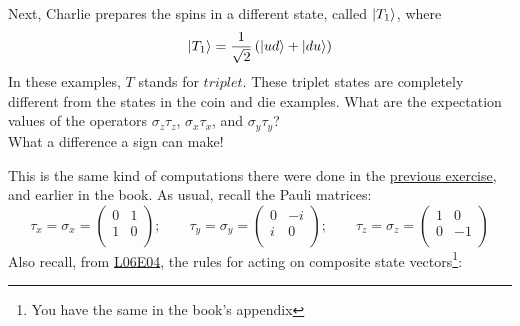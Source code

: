 \documentclass[solutions.tex]{subfiles}
\begin{document}
\maketitle
\begin{exercise} Next, Charlie prepares the spins in a different
state, called $|T_1\rangle$, where
\[
	|T_1\rangle = \frac1{\sqrt2}\left(|ud\rangle+|du\rangle\right)
\]
In these examples, $T$ stands for $\textit{triplet}$. These triplet
states are completely different from the states in the coin and die
examples. What are the expectation values of the operators $\sigma_z\tau_z$,
$\sigma_x\tau_x$, and $\sigma_y\tau_y$? \\

What a difference a sign can make!
\end{exercise}
This is the same kind of computations there were done in the
\href{https://github.com/mbivert/ttm/blob/master/qm/L06E06.pdf}{previous exercise},
and earlier in the book. As usual, recall the Pauli matrices:
\[
	\tau_x = \sigma_x = \begin{pmatrix}
		0 & 1 \\
		1 & 0 \\
	\end{pmatrix};\qquad \tau_y = \sigma_y = \begin{pmatrix}
		0 & -i \\
		i & 0 \\
	\end{pmatrix};\qquad \tau_z = \sigma_z = \begin{pmatrix}
		1 & 0 \\
		0 & -1 \\
	\end{pmatrix}
\]
Also recall, from
\href{https://github.com/mbivert/ttm/blob/master/qm/L06E04.pdf}{L06E04},
the rules for acting on composite state vectors\footnote{You have the same
in the book's appendix}:
\end{document}
